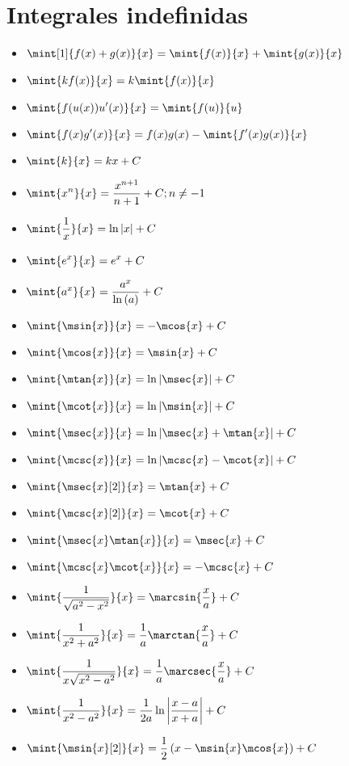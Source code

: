 \section{Integrales indefinidas}
\begin{itemize}
	\item $\ds\mint[1]{f(x) + g(x)}{x} =\mint{f(x)}{x} + \mint{g(x)}{x}$
	\item $\ds\mint{kf(x)}{x} =k\mint{f(x)}{x}$
	\item $\ds\mint{f(u(x))u'(x)}{x} =\mint{f(u)}{u}$
	\item $\ds\mint{f(x)g'(x)}{x} = f(x)g(x) -\mint{f'(x)g(x)}{x}$
	\item $\ds\mint{k}{x} = kx + C$
	\item $\ds\mint{x^{n}}{x} =\dfrac{x^{n + 1}}{n + 1} + C ; n\neq -1$
	\item $\ds\mint{\dfrac{1}{x}}{x} =\mln[1]{\abs{x}} + C$
	\item $\ds\mint{e^{x}}{x} = e^{x} + C$
	\item $\ds\mint{a^{x}}{x} =\dfrac{a^{x}}{\mln{a}} + C$
	\item $\ds\mint{\msin{x}}{x} = -\mcos{x} + C$
	\item $\ds\mint{\mcos{x}}{x} = \msin{x} + C$
	\item $\ds\mint{\mtan{x}}{x} =\mln[1]{\abs{\msec{x}}} + C$
	\item $\ds\mint{\mcot{x}}{x} =\mln[1]{\abs{\msin{x}}} + C$
	\item $\ds\mint{\msec{x}}{x} =\mln[1]{\abs{\msec{x} +\mtan{x}}} + C$
	\item $\ds\mint{\mcsc{x}}{x} =\mln[1]{\abs{\mcsc{x} -\mcot{x}}} + C$
	\item $\ds\mint{\msec{x}[2]}{x} =\mtan{x} + C$
	\item $\ds\mint{\mcsc{x}[2]}{x} =\mcot{x} + C$
	\item $\ds\mint{\msec{x}\mtan{x}}{x} =\msec{x} + C$
	\item $\ds\mint{\mcsc{x}\mcot{x}}{x} = -\mcsc{x} + C$
	\item $\ds\mint{\dfrac{1}{\sqrt{a^{2} - x^{2}}}}{x} =\marcsin{\dfrac{x}{a}} + C$
	\item $\ds\mint{\dfrac{1}{x^{2} + a^{2}}}{x} =\dfrac{1}{a}\marctan{\dfrac{x}{a}} + C$
	\item $\ds\mint{\dfrac{1}{x\sqrt{x^{2} - a^{2}}}}{x} =\dfrac{1}{a}\marcsec{\dfrac{x}{a}} + C$
	\item $\ds\mint{\dfrac{1}{x^{2} - a^{2}}}{x} =\dfrac{1}{2a}\mln[1]{\abs{\dfrac{x - a}{x + a}}} + C$
	\item $\ds\mint{\msin{x}[2]}{x} =\dfrac{1}{2}\pa{x -\msin{x}\mcos{x}} + C$

\end{itemize}
